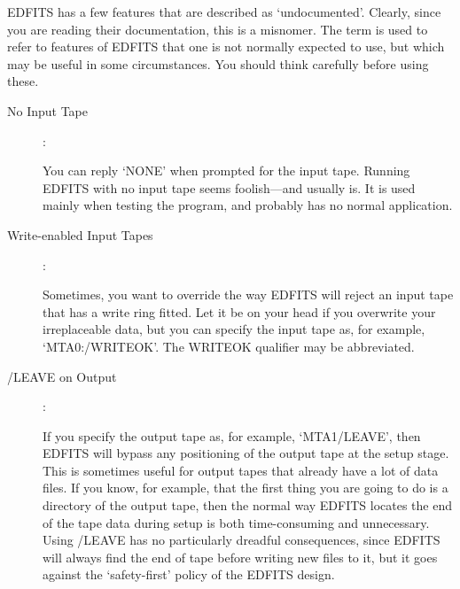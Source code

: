 EDFITS has a few features that are described as `undocumented'.  Clearly,
since you are reading their documentation, this is a misnomer.  The term is
used to refer to features of EDFITS that one is not normally expected to use,
but which may be useful in some circumstances.  You should think carefully
before using these.
\begin{description}

\item[No Input Tape]:

You can reply `NONE' when prompted for the input tape.
Running EDFITS with no input tape seems foolish---and usually is.  It is
used mainly when testing the program, and probably has no normal application.

\item[Write-enabled Input Tapes]:

Sometimes, you want to override the way
EDFITS will reject an input tape that has a write ring fitted.  Let it be
on your head if you overwrite your irreplaceable data, but you can specify
the input tape as, for example, `MTA0:/WRITEOK'.  The WRITEOK qualifier
may be abbreviated.
\item[/LEAVE on Output]:

If you specify the output tape as, for example,
`MTA1/LEAVE', then EDFITS will bypass any positioning of the output tape
at the setup stage.  This is sometimes useful for output tapes that
already have a lot of data files. If you know, for example, that the first
thing you are going to do is a directory of the output tape, then the 
normal way EDFITS locates the end of the tape data during setup is both
time-consuming and unnecessary.  Using /LEAVE has no particularly dreadful
consequences, since EDFITS will always find the end of tape before writing
new files to it, but it goes against the `safety-first' policy of the 
EDFITS design.
\end{description}

